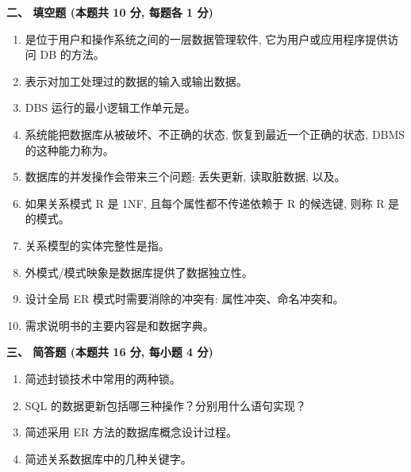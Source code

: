 \documentclass{ctexart} %
\begin{document}
\clearpage %

\pagestyle{plain}

\raggedright
\textbf{\large 二、 填空题 (本题共 10 分, 每题各 1 分)}
\vspace{1em}

\begin{enumerate}[label=\arabic*.]
    \item \underline{\hspace{4cm}}是位于用户和操作系统之间的一层数据管理软件, 它为用户或应用程序提供访问 DB 的方法。
    \item \underline{\hspace{4cm}}表示对加工处理过的数据的输入或输出数据。
    \item DBS 运行的最小逻辑工作单元是\underline{\hspace{4cm}}。
    \item 系统能把数据库从被破坏、不正确的状态, 恢复到最近一个正确的状态, DBMS 的这种能力称为\underline{\hspace{4cm}}。
    \item 数据库的并发操作会带来三个问题: 丢失更新, 读取脏数据, 以及\underline{\hspace{4cm}}。
    \item 如果关系模式 R 是 1NF, 且每个属性都不传递依赖于 R 的候选键, 则称 R 是\underline{\hspace{4cm}}的模式。
    \item 关系模型的实体完整性是指\underline{\hspace{4cm}}。
    \item 外模式/模式映象是数据库提供了\underline{\hspace{4cm}}数据独立性。
    \item 设计全局 ER 模式时需要消除的冲突有: 属性冲突、命名冲突和\underline{\hspace{4cm}}。
    \item 需求说明书的主要内容是\underline{\hspace{4cm}}和数据字典。
\end{enumerate}

\vspace{2em}

\raggedright
\textbf{\large 三、 简答题 (本题共 16 分, 每小题 4 分)}
\vspace{1em}

\begin{enumerate}[label=\arabic*.]
    \item 简述封锁技术中常用的两种锁。
    \item SQL 的数据更新包括哪三种操作？分别用什么语句实现？
    \item 简述采用 ER 方法的数据库概念设计过程。
    \item 简述关系数据库中的几种关键字。
\end{enumerate}
\end{document}
